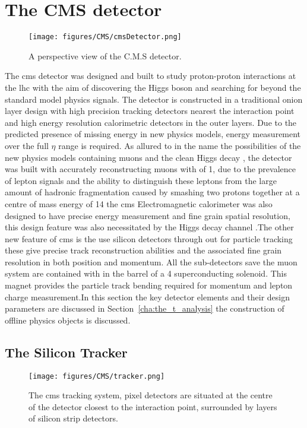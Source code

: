 \chapter{The CMS detector} %
\label{cha:the_cms_detector}
\begin{figure}[htbp]
  \centering
    \texttt{[image: figures/CMS/cmsDetector.png]}
  \caption{A perspective view of the C.M.S detector\cite{cms-sketchup}.}
  \label{fig:figures_CMS_cmsDetector}
\end{figure}

The \ac{cms} detector was designed and built to study proton-proton 
interactions at the \ac{lhc} with the aim of discovering the Higgs boson and 
searching for beyond the standard model physics signals. The detector is 
constructed in a traditional onion layer design with high precision tracking 
detectors nearest the interaction point and high energy resolution calorimetric 
detectors in the outer layers. Due to the predicted presence of missing energy 
\MET in new physics models, energy measurement over the full $\eta$ range is 
required. As allured to in the name the possibilities of the new physics models 
containing muons and the clean Higgs decay 
\HepProcess{\PH\to\PZ\PZ\to\Pmu\Pmu\Pmu\Pmu}, the detector was built with 
accurately reconstructing muons with \PT of \unit{1}{\TeV}, due to the 
prevalence of lepton signals and the ability to distinguish these leptons from 
the large amount of hadronic fragmentation caused by smashing two protons 
together at a centre of mass energy of \unit{14}{\TeV} the \ac{cms} 
Electromagnetic calorimeter was also designed to have precise energy 
measurement and fine grain spatial resolution, this design feature was also 
necessitated by the Higgs decay channel \HepProcess{\PH\to\Pphoton\Pphoton}.The 
other new feature of \ac{cms} is the use silicon detectors through out for 
particle tracking these give precise track reconstruction abilities and the 
associated fine grain resolution in both position and momentum. All the 
sub-detectors save the muon system are contained with in the barrel of a 
\unit{4}{\tesla} superconducting solenoid. This magnet provides the particle 
track bending required for momentum and lepton charge measurement.In this 
section the key detector elements and their design parameters are discussed in 
Section~\ref{cha:the_t_analysis} the construction of offline 
physics objects is discussed.

\section{The Silicon Tracker} %
\label{sec:the_silicon_tracker}
\begin{figure}[htbp]
  \centering
    \texttt{[image: figures/CMS/tracker.png]}
  \caption{The \ac{cms} tracking system, pixel detectors are situated at the centre of the detector closest to the interaction point, surrounded by layers of silicon strip detectors\cite{cms-sketchup}.}
  \label{fig:figures_CMS_tracker}
\end{figure}


